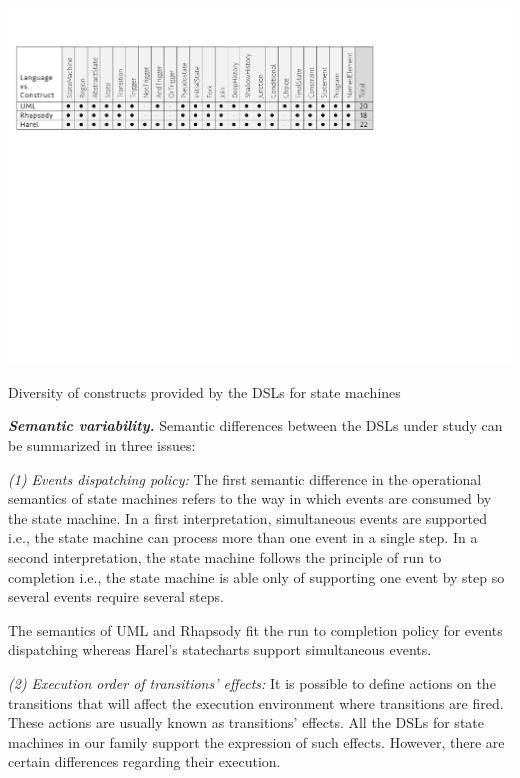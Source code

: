 \begin{table}[t]
\centering
\includegraphics[width=1\linewidth]{images/tab-oracle-statemachines}
\caption{Diversity of constructs provided by the DSLs for state machines}
\label{fig:oracle}
\end{table}

\vspace{2mm}
\textit{\textbf{Semantic variability.}} Semantic differences between the DSLs under study can be summarized in three issues: 

\vspace{2mm}
\textit{(1) Events dispatching policy:} The first semantic difference in the operational semantics of state machines refers to the way in which events are consumed by the state machine. In a first interpretation, simultaneous events are supported i.e., the state machine can process more than one event in a single step. In a second interpretation, the state machine follows the principle of run to completion i.e., the state machine is able only of supporting one event by step so several events require several steps.

The semantics of UML and Rhapsody fit the run to completion policy for events dispatching whereas Harel's statecharts support simultaneous events.

\vspace{2mm}
\textit{(2) Execution order of transitions' effects:} It is possible to define actions on the transitions that will affect the execution environment where transitions are fired. These actions are usually known as transitions' effects. All the DSLs for state machines in our family support the expression of such effects. However, there are certain differences regarding their execution.


